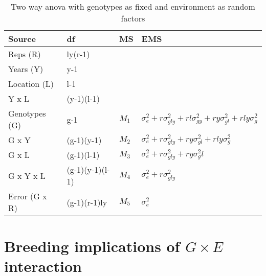 \documentclass[11pt,dvipsnames,ignorenonframetext,aspectratio=169]{beamer}
\begin{document}
\begin{frame}{}
\protect\hypertarget{section-7}{}

\begin{table}[t]

\caption{\label{tab:anova-mixed}Two way anova with genotypes as fixed and environment as random factors}
\centering
\fontsize{6}{8}\selectfont
\begin{tabular}{llll}
\toprule
Source & df & MS & EMS\\
\midrule
Reps (R) & ly(r-1) &  & \\
Years (Y) & y-1 &  & \\
Location (L) & l-1 &  & \\
Y x L & (y-1)(l-1) &  & \\
Genotypes (G) & g-1 & $M_1$ & $\sigma^2_e + r\sigma^2_{gly} + rl\sigma^2_{gy} + ry\sigma^2_{gl} + rly\sigma^2_g$\\
\addlinespace
G x Y & (g-1)(y-1) & $M_2$ & $\sigma^2_e + r\sigma^2_{gly} + ry\sigma^2_{gl} + rly\sigma^2_g$\\
G x L & (g-1)(l-1) & $M_3$ & $\sigma^2_e + r\sigma^2_{gly} + ry\sigma^2_gl$\\
G x Y x L & (g-1)(y-1)(l-1) & $M_4$ & $\sigma^2_e + r\sigma^2_{gly}$\\
Error (G x R) & (g-1)(r-1)ly & $M_5$ & $\sigma^2_e$\\
\bottomrule
\end{tabular}
\end{table}

\end{frame}

\hypertarget{breeding-implications-of-g-times-e-interaction}{%
\section{\texorpdfstring{Breeding implications of \(G \times E\)
interaction}{Breeding implications of G \textbackslash{}times E interaction}}\label{breeding-implications-of-g-times-e-interaction}}
\end{document}
